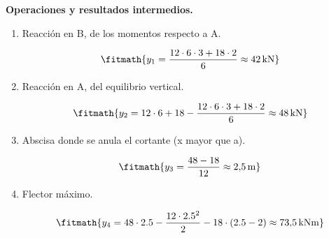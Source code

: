 \noindent\textbf{Operaciones y resultados intermedios.}

\begin{enumerate}

\item Reacción en B, de los momentos respecto a A.

\[\fitmath{y_{1}=\frac{12\cdot 6\cdot 3+18\cdot 2}{6}\approx 42\,\mathrm{kN}}\]

\item Reacción en A, del equilibrio vertical.

\[\fitmath{y_{2}=12\cdot 6+18-\frac{12\cdot 6\cdot 3+18\cdot 2}{6}\approx 48\,\mathrm{kN}}\]

\item Abscisa donde se anula el cortante (x mayor que a).

\[\fitmath{y_{3}=\frac{48-18}{12}\approx 2{,}5\,\mathrm{m}}\]

\item Flector máximo.

\[\fitmath{y_{4}=48\cdot 2.5-\frac{12\cdot {2.5}^{2}}{2}-18\cdot \left(2.5-2\right)\approx 73{,}5\,\mathrm{kN m}}\]

\end{enumerate}
